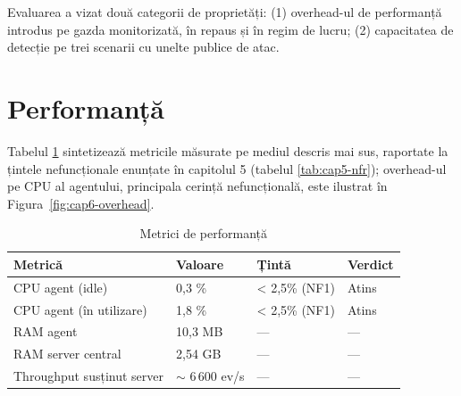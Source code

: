 Evaluarea a vizat două categorii de proprietăți: (1) overhead-ul de
performanță introdus pe gazda monitorizată, în repaus și în regim de lucru;
(2) capacitatea de detecție pe trei scenarii cu unelte publice de atac.

\section{Performanță}

Tabelul \ref{tab:cap6-perf} sintetizează metricile măsurate pe mediul descris
mai sus, raportate la țintele nefuncționale enunțate în capitolul 5
(tabelul \ref{tab:cap5-nfr}); overhead-ul pe CPU al agentului, principala cerință
nefuncțională, este ilustrat în Figura~\ref{fig:cap6-overhead}.

\begin{table}[h]
  \centering
  \caption{Metrici de performanță}
  \label{tab:cap6-perf}
  \renewcommand{\arraystretch}{1.08}
  \begin{tabular}{|l|l|l|l|}
    \hline
    \textbf{Metrică} & \textbf{Valoare} & \textbf{Țintă} & \textbf{Verdict} \\
    \hline\hline
    CPU agent (idle)                          & 0{,}3 \%  & < 2,5\% (NF1) & Atins \\
    \hline
    CPU agent (în utilizare)                  & 1{,}8 \%  & < 2,5\% (NF1) & Atins \\
    \hline
    RAM agent                                 & 10{,}3 MB & ---           & ---   \\
    \hline
    RAM server central                        & 2{,}54 GB & ---           & ---   \\
    \hline
    Throughput susținut server                & $\sim$ 6\,600 ev/s & ---  & ---   \\
    \hline
  \end{tabular}
\end{table}

